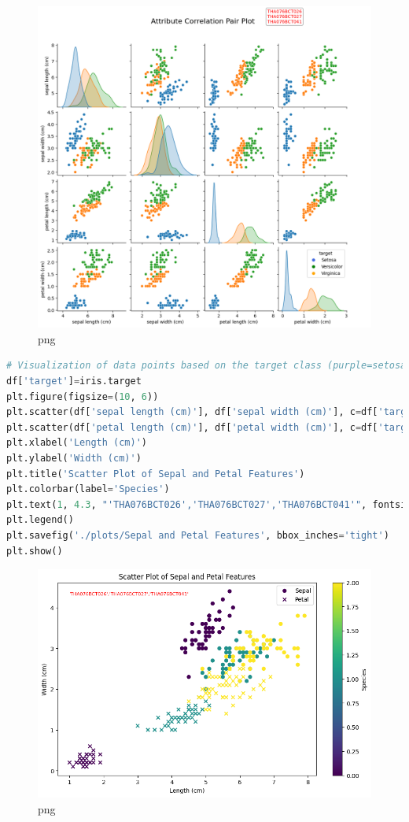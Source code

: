 \documentclass[
]{article}
\begin{document}
\begin{figure}
\centering
\includegraphics{PCA on IRIS_files/PCA on IRIS_10_1.png}
\caption{png}
\end{figure}

\begin{lstlisting}[language=Python]
# Visualization of data points based on the target class (purple=setosa,green=Versicolour,yellow=Virginica )
df['target']=iris.target
plt.figure(figsize=(10, 6))
plt.scatter(df['sepal length (cm)'], df['sepal width (cm)'], c=df['target'], label='Sepal')
plt.scatter(df['petal length (cm)'], df['petal width (cm)'], c=df['target'], marker='x', label='Petal')
plt.xlabel('Length (cm)')
plt.ylabel('Width (cm)')
plt.title('Scatter Plot of Sepal and Petal Features')
plt.colorbar(label='Species')
plt.text(1, 4.3, "'THA076BCT026','THA076BCT027','THA076BCT041'", fontsize=8,color='red')
plt.legend()
plt.savefig('./plots/Sepal and Petal Features', bbox_inches='tight')
plt.show()
\end{lstlisting}

\begin{figure}
\centering
\includegraphics{PCA on IRIS_files/PCA on IRIS_11_0.png}
\caption{png}
\end{figure}
\end{document}
